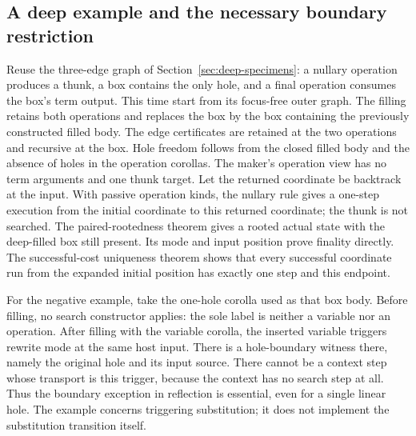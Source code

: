 \subsection{A deep example and the necessary boundary restriction}
Reuse the three-edge graph of Section~\ref{sec:deep-specimens}: a nullary
operation produces a thunk, a box contains the only hole, and a final operation
consumes the box's term output. This time start from its focus-free outer graph.
The filling retains both operations and replaces the box by the box containing
the previously constructed filled body. The edge certificates are retained at
the two operations and recursive at the box. Hole freedom follows from the
closed filled body and the absence of holes in the operation corollas.
The maker's operation view has no term arguments and one thunk target.
Let the returned coordinate be backtrack at the input. With passive operation
kinds, the nullary rule gives a one-step execution from the initial coordinate
to this returned coordinate; the thunk is not searched.
The paired-rootedness theorem gives a rooted actual state with the deep-filled
box still present. Its mode and input position prove finality directly. The
successful-cost uniqueness theorem shows that every successful coordinate run
from the expanded initial position has exactly one step and this endpoint.

For the negative example, take the one-hole corolla used as that box body.
Before filling, no search constructor applies: the sole label is neither a
variable nor an operation. After filling with the variable corolla, the inserted
variable triggers rewrite mode at the same host input. There is a hole-boundary
witness there, namely the original hole and its input source. There cannot be a
context step whose transport is this trigger, because the context has no search
step at all. Thus the boundary exception in reflection is essential, even for
a single linear hole. The example concerns triggering substitution; it does
not implement the substitution transition itself.
